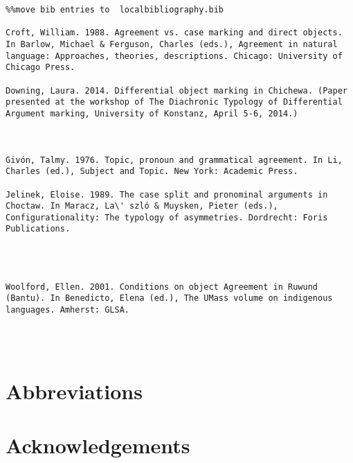 \documentclass[output=paper]{langsci/langscibook}
\begin{document}
\begin{verbatim}%%move bib entries to  localbibliography.bib

Croft, William. 1988. Agreement vs. case marking and direct objects. In Barlow, Michael & Ferguson, Charles (eds.), Agreement in natural language: Approaches, theories, descriptions. Chicago: University of Chicago Press.

Downing, Laura. 2014. Differential object marking in Chichewa. (Paper presented at the workshop of The Diachronic Typology of Differential Argument marking, University of Konstanz, April 5-6, 2014.)



Givón, Talmy. 1976. Topic, pronoun and grammatical agreement. In Li, Charles (ed.), Subject and Topic. New York: Academic Press.

Jelinek, Eloise. 1989. The case split and pronominal arguments in Choctaw. In Maracz, La\' szló & Muysken, Pieter (eds.), Configurationality: The typology of asymmetries. Dordrecht: Foris Publications.




Woolford, Ellen. 2001. Conditions on object Agreement in Ruwund (Bantu). In Benedicto, Elena (ed.), The UMass volume on indigenous languages. Amherst: GLSA.




\end{verbatim}

\section*{Abbreviations}
\section*{Acknowledgements}

\printbibliography[heading=subbibliography,notkeyword=this]
\end{document}
